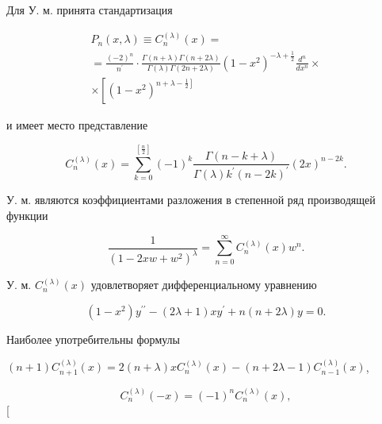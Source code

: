 \documentclass[10pt]{article}
\begin{document}
Для У. м. принята стандартизация



\[

\begin{gathered}

P_{n}(x, \lambda) \equiv C_{n}^{(\lambda)}(x)= \\

=\frac{(-2)^{n}}{n^{\prime}} \cdot \frac{\Gamma(n+\lambda) \Gamma(n+2 \lambda)}{\Gamma(\lambda) \Gamma(2 n+2 \lambda)}\left(1-x^{2}\right)^{-\lambda+\frac{1}{2}} \frac{d^{n}}{d x^{n}} \times \\

\times\left[\left(1-x^{2}\right)^{\left.n+\lambda-\frac{1}{2}\right]}\right.

\end{gathered}

\]



и имеет место представление



\[

C_{n}^{(\lambda)}(x)=\sum_{k=0}^{\left[\frac{n}{2}\right]}(-1)^{k} \frac{\Gamma(n-k+\lambda)}{\Gamma(\lambda) k^{\prime}(n-2 k)^{\prime}}(2 x)^{n-2 k} .

\]



У. м. являются коэффициентами разложения в степенной ряд производящей функции



\[

\frac{1}{\left(1-2 x w+w^{2}\right)^{\lambda}}=\sum_{n=0}^{\infty} C_{n}^{(\lambda)}(x) w^{n} .

\]



У. м. $C_{n}^{(\lambda)}(x)$ удовлетворяет дифференциальному уравнению



\[

\left(1-x^{2}\right) y^{\prime \prime}-(2 \lambda+1) x y^{\prime}+n(n+2 \lambda) y=0 .

\]



Наиболее употребительны формулы



$(n+1) C_{n+1}^{(\lambda)}(x)=2(n+\lambda) x C_{n}^{(\lambda)}(x)-(n+2 \lambda-1) C_{n-1}^{(\lambda)}(x)$,



\[

C_{n}^{(\lambda)}(-x)=(-1)^{n} C_{n}^{(\lambda)}(x),

\][
\end{document}
